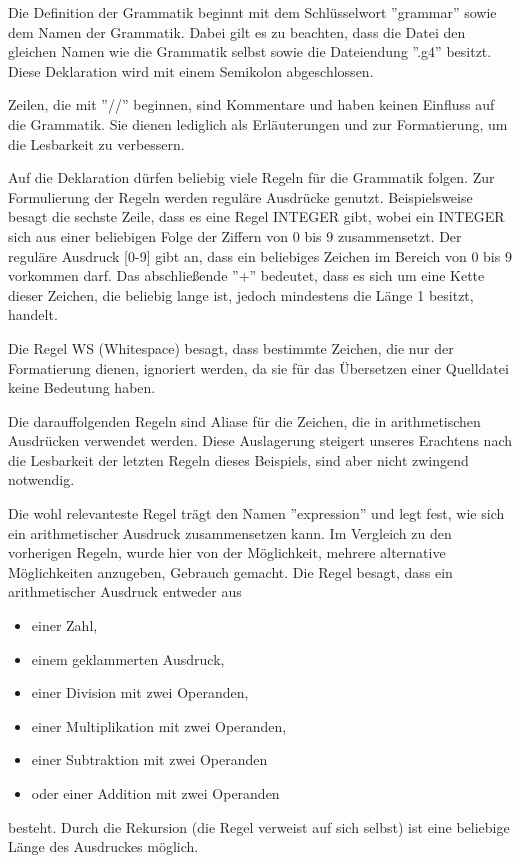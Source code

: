 Die Definition der Grammatik beginnt mit dem Schlüsselwort ''grammar'' sowie dem Namen der Grammatik. Dabei gilt es zu beachten, dass die Datei den gleichen Namen wie die Grammatik selbst sowie die Dateiendung ''.g4'' besitzt. Diese Deklaration wird mit einem Semikolon abgeschlossen.

Zeilen, die mit ''//'' beginnen, sind Kommentare und haben keinen Einfluss auf die Grammatik. Sie dienen lediglich als Erläuterungen und zur Formatierung, um die Lesbarkeit zu verbessern.

Auf die Deklaration dürfen beliebig viele Regeln für die Grammatik folgen. Zur Formulierung der Regeln werden reguläre Ausdrücke genutzt. Beispielsweise besagt die sechste Zeile, dass es eine Regel INTEGER gibt, wobei ein INTEGER sich aus einer beliebigen Folge der Ziffern von 0 bis 9 zusammensetzt. Der reguläre Ausdruck [0-9] gibt an, dass ein beliebiges Zeichen im Bereich von 0 bis 9 vorkommen darf. Das abschließende ''+'' bedeutet, dass es sich um eine Kette dieser Zeichen, die beliebig lange ist, jedoch mindestens die Länge 1 besitzt, handelt.

Die Regel WS (Whitespace) besagt, dass bestimmte Zeichen, die nur der Formatierung dienen, ignoriert werden, da sie für das Übersetzen einer Quelldatei keine Bedeutung haben.

Die darauffolgenden Regeln sind Aliase für die Zeichen, die in arithmetischen Ausdrücken verwendet werden. Diese Auslagerung steigert unseres Erachtens nach die Lesbarkeit der letzten Regeln dieses Beispiels, sind aber nicht zwingend notwendig.

Die wohl relevanteste Regel trägt den Namen ''expression'' und legt fest, wie sich ein arithmetischer Ausdruck zusammensetzen kann. Im Vergleich zu den vorherigen Regeln, wurde hier von der Möglichkeit, mehrere alternative Möglichkeiten anzugeben, Gebrauch gemacht. Die Regel besagt, dass ein arithmetischer Ausdruck entweder aus 
\begin{itemize}
\item einer Zahl,
\item einem geklammerten Ausdruck,
\item einer Division mit zwei Operanden,
\item einer Multiplikation mit zwei Operanden,
\item einer Subtraktion mit zwei Operanden
\item oder einer Addition mit zwei Operanden
\end{itemize}
besteht.
Durch die Rekursion (die Regel verweist auf sich selbst) ist eine beliebige Länge des Ausdruckes möglich.

